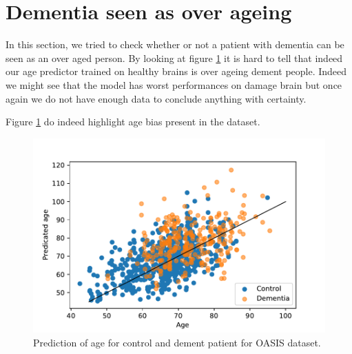 \section{Dementia seen as over ageing}
In this section, we tried to check whether or not a patient with dementia can be seen as an over aged person. By looking at figure \ref{fig:dem_vs_control_age_pred} it is hard to tell that indeed our age predictor trained on healthy brains is over ageing dement people. Indeed we might see that the model has worst performances on damage brain but once again we do not have enough data to conclude anything with certainty. 

Figure \ref{fig:dem_vs_control_age_pred} do indeed highlight age bias present in the dataset. 
\begin{figure}
 \centering
 \includegraphics[width=.9\linewidth]{figures/Experiements/dem_vs_cont_age_pred.pdf}
 \captionsetup{width=.9\linewidth}
 \caption{Prediction of age for control and dement patient for OASIS dataset.}
 \label{fig:dem_vs_control_age_pred}
\end{figure}
